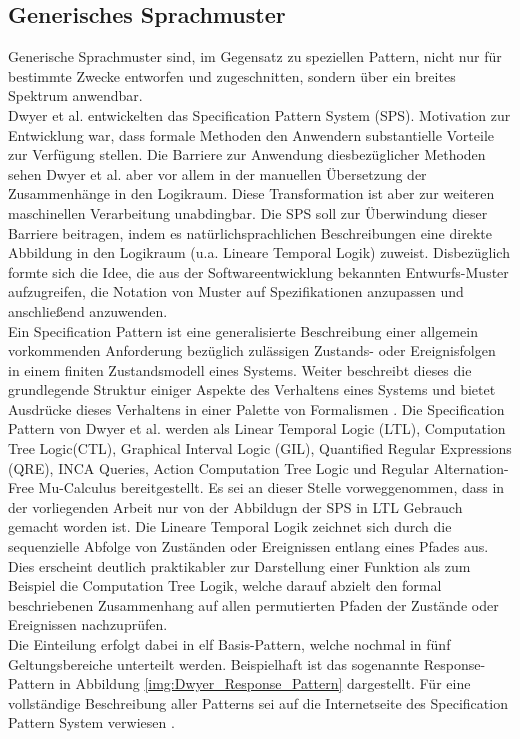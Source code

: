 \subsection{Generisches Sprachmuster}
\label{subsec:genPatterns}
Generische Sprachmuster sind, im Gegensatz zu speziellen Pattern, nicht nur für bestimmte Zwecke entworfen und zugeschnitten, sondern über ein breites Spektrum anwendbar.\\
Dwyer et al. \cite{DAC98} entwickelten das Specification Pattern System (SPS). Motivation zur Entwicklung war, dass formale Methoden den Anwendern substantielle Vorteile zur Verfügung stellen. Die Barriere zur Anwendung diesbezüglicher Methoden sehen Dwyer et al. aber vor allem in der manuellen Übersetzung der Zusammenhänge in den Logikraum. Diese Transformation ist aber zur weiteren maschinellen Verarbeitung unabdingbar. Die SPS soll zur Überwindung dieser Barriere beitragen, indem es natürlichsprachlichen Beschreibungen eine direkte Abbildung in den Logikraum (u.a. Lineare Temporal Logik) zuweist. Disbezüglich formte sich die Idee, die aus der Softwareentwicklung bekannten Entwurfs-Muster aufzugreifen, die Notation von Muster auf Spezifikationen anzupassen und anschließend anzuwenden.\\
Ein Specification Pattern ist eine generalisierte Beschreibung einer allgemein vorkommenden Anforderung bezüglich zulässigen Zustands- oder Ereignisfolgen in einem finiten Zustandsmodell eines Systems. Weiter beschreibt dieses die grundlegende Struktur einiger Aspekte des Verhaltens eines Systems und bietet Ausdrücke dieses Verhaltens in einer Palette von Formalismen \cite{DAC98}. Die Specification Pattern von Dwyer et al. werden als Linear Temporal Logic (LTL), Computation Tree Logic(CTL), Graphical Interval Logic (GIL), Quantified Regular Expressions (QRE), INCA Queries, Action Computation Tree Logic und Regular Alternation-Free Mu-Calculus bereitgestellt. Es sei an dieser Stelle vorweggenommen, dass in der vorliegenden Arbeit nur von der Abbildugn der SPS in LTL Gebrauch gemacht worden ist. Die Lineare Temporal Logik zeichnet sich durch die sequenzielle Abfolge von Zuständen oder Ereignissen entlang eines Pfades aus. Dies erscheint deutlich praktikabler zur Darstellung einer Funktion als zum Beispiel die Computation Tree Logik, welche darauf abzielt den formal beschriebenen Zusammenhang auf allen permutierten Pfaden der Zustände oder Ereignissen nachzuprüfen.\\    
Die Einteilung erfolgt dabei in elf Basis-Pattern, welche nochmal in fünf Geltungsbereiche unterteilt werden. Beispielhaft ist das sogenannte Response-Pattern in Abbildung \ref{img:Dwyer_Response_Pattern} dargestellt. Für eine vollständige Beschreibung aller Patterns sei auf die Internetseite des Specification Pattern System verwiesen \cite{DACDAP17}.\\
